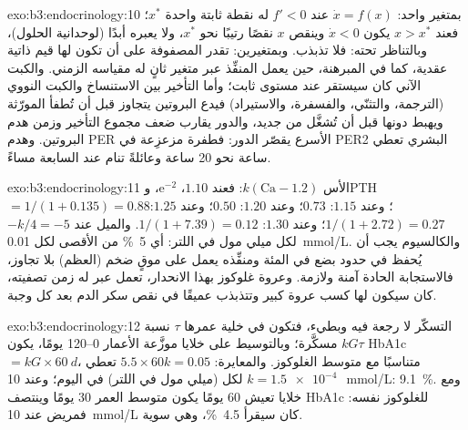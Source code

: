 \begin{solution}{exo:b3:endocrinology:10}
بمتغير واحد: $\dot x = f(x)$ عند $f' < 0$ له نقطة ثابتة واحدة
$x^{*}$؛ فعند $x > x^{*}$ يكون $\dot x < 0$ وينقص $x$ نقصًا
رتيبًا نحو $x^{*}$، ولا يعبره أبدًا (لوحدانية الحلول)،
وبالتناظر تحته: فلا تذبذب. وبمتغيرين: تقدر المصفوفة على أن
تكون لها قيم ذاتية عقدية، كما في المبرهنة، حين يعمل المنفِّذ
عبر متغير ثانٍ له مقياسه الزمني. والكبت الآني كان سيستقر عند
مستوى ثابت؛ وأما التأخير بين الاستنساخ والكبت النووي
(الترجمة، والتثنّي، والفسفرة، والاستيراد) فيدع البروتين
يتجاوز قبل أن تُطفأ المورّثة ويهبط دونها قبل أن تُشغَّل من
جديد، والدور يقارب ضعف مجموع التأخير وزمن هدم البروتين. وهدم
PER الأسرع يقصّر الدور: فطفرة مزعزِعة في PER2 البشري تعطي
ساعة نحو 20 ساعة وعائلةً تنام عند السابعة مساءً.
\end{solution}

\begin{solution}{exo:b3:endocrinology:11}
الأس $k(\text{Ca} - 1.2)$: فعند $1.10$، $\mathrm{e}^{-2}$، وPTH $= 1/
(1 + 0.135) = 0.88$؛ وعند $1.15$: $0.73$؛ وعند $1.20$: $0.50$؛ وعند $1.25$: $1/(1 +
2.72) = 0.27$؛ وعند $1.30$: $1/(1 + 7.39) = 0.12$. والميل عند 
$-k/4 = -5$ لكل ميلي مول في اللتر: أي \qty{5}{\%} من الأقصى لكل
\qty{0.01}{mmol/L}. والكالسيوم يجب أن يُحفظ في حدود بضع في
المئة ومنفِّذه يعمل على موقٍ ضخم (العظم) بلا تجاوز، فالاستجابة
الحادة آمنة ولازمة. وعروة غلوكوز بهذا الانحدار، تعمل عبر
 له زمن تصفيته، كان سيكون لها كسب عروة كبير وتتذبذب
عميقًا في نقص سكر الدم بعد كل وجبة.
\end{solution}

\begin{solution}{exo:b3:endocrinology:12}
التسكّر لا رجعة فيه وبطيء، فتكون في خلية عمرها $\tau$ نسبة
$kG\tau$ مسكَّرة؛ وبالتوسيط على خلايا موزَّعة الأعمار
\numrange{0}{120} يومًا، يكون HbA1c $= kG\times\qty{60}{d}$، متناسبًا
مع متوسط الغلوكوز. والمعايرة: $5.5\times 60k = 0.05$ تعطي $k =
\qty{1.5e-4}{}$ لكل (ميلي مول في اللتر) في اليوم؛ وعند \qty{10}{mmol/L}: \qty{9.1}{\%}.
ومع خلايا تعيش 60 يومًا يكون متوسط العمر 30 يومًا وينتصف
HbA1c للغلوكوز نفسه: فمريض عند \qty{10}{mmol/L} كان سيقرأ
\qty{4.5}{\%}، وهي سوية.
\end{solution}


